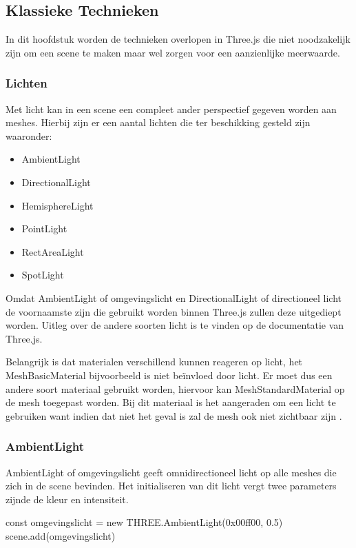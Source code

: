 \subsection{Klassieke Technieken}

In dit hoofdstuk worden de technieken overlopen in Three.js die niet noodzakelijk zijn om een scene te maken maar wel zorgen voor een aanzienlijke meerwaarde.

\subsubsection{Lichten}

Met licht kan in een scene een compleet ander perspectief gegeven worden aan meshes. Hierbij zijn er een aantal lichten die ter beschikking gesteld zijn waaronder:

\begin{itemize}
	\item AmbientLight
	\item DirectionalLight
	\item HemisphereLight
	\item PointLight
	\item RectAreaLight
	\item SpotLight
\end{itemize}

Omdat AmbientLight of omgevingslicht en DirectionalLight of directioneel licht de voornaamste zijn die gebruikt worden binnen Three.js zullen deze uitgediept worden. Uitleg over de andere soorten licht is te vinden op de documentatie van Three.js.

Belangrijk is dat materialen verschillend kunnen reageren op licht, het MeshBasicMaterial bijvoorbeeld is niet beïnvloed door licht. Er moet dus een andere soort materiaal gebruikt worden, hiervoor kan MeshStandardMaterial op de mesh toegepast worden. Bij dit materiaal is het aangeraden om een licht te gebruiken want indien dat niet het geval is zal de mesh ook niet zichtbaar zijn \autocite{Simon2023}.

\subsubsection{AmbientLight}

AmbientLight of omgevingslicht geeft omnidirectioneel licht op alle meshes die zich in de scene bevinden. Het initialiseren van dit licht vergt twee parameters zijnde de kleur en intensiteit.

\begin{LVerbatim}
const omgevingslicht = new THREE.AmbientLight(0x00ff00, 0.5)
scene.add(omgevingslicht)
\end{LVerbatim}

